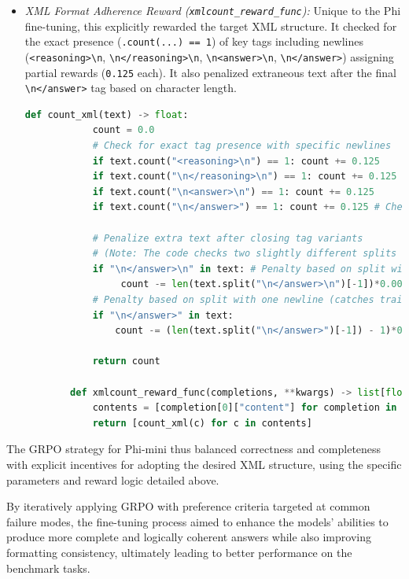 \documentclass[11pt]{article}
\begin{document}
\begin{itemize}
\begin{itemize}
\begin{itemize}
        \item \textit{XML Format Adherence Reward (\texttt{xmlcount\_reward\_func}):} Unique to the Phi fine-tuning, this explicitly rewarded the target XML structure. It checked for the exact presence (\texttt{.count(...) == 1}) of key tags including newlines (\verb|<reasoning>\n|, \verb|\n</reasoning>\n|, \verb|\n<answer>\n|, \verb|\n</answer>|) assigning partial rewards (\texttt{0.125} each). It also penalized extraneous text after the final \verb|\n</answer>| tag based on character length.
        \begin{lstlisting}[language=Python, caption={XML structure adherence reward (Phi)}, label={lst:phi_xmlcount_updated}]
        def count_xml(text) -> float:
            count = 0.0
            # Check for exact tag presence with specific newlines
            if text.count("<reasoning>\n") == 1: count += 0.125
            if text.count("\n</reasoning>\n") == 1: count += 0.125
            if text.count("\n<answer>\n") == 1: count += 0.125
            if text.count("\n</answer>") == 1: count += 0.125 # Check for closing tag
        
            # Penalize extra text after closing tag variants
            # (Note: The code checks two slightly different splits for penalty)
            if "\n</answer>\n" in text: # Penalty based on split with two newlines
                 count -= len(text.split("\n</answer>\n")[-1])*0.001
            # Penalty based on split with one newline (catches trailing chars/spaces)
            if "\n</answer>" in text:
                count -= (len(text.split("\n</answer>")[-1]) - 1)*0.001 # -1 for potential final newline
        
            return count
        
        def xmlcount_reward_func(completions, **kwargs) -> list[float]:
            contents = [completion[0]["content"] for completion in completions]
            return [count_xml(c) for c in contents]
        \end{lstlisting}

    \end{itemize}
    The GRPO strategy for Phi-mini thus balanced correctness and completeness with explicit incentives for adopting the desired XML structure, using the specific parameters and reward logic detailed above.
\end{itemize}


By iteratively applying GRPO with preference criteria targeted at common failure modes, the fine-tuning process aimed to enhance the models' abilities to produce more complete and logically coherent answers while also improving formatting consistency, ultimately leading to better performance on the benchmark tasks.



\end{itemize}
\end{document}
